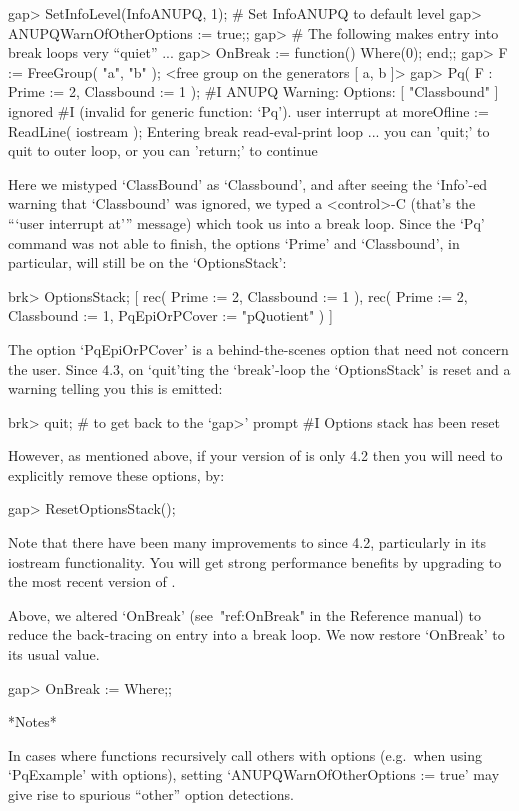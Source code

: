 \begintt
gap> SetInfoLevel(InfoANUPQ, 1);        # Set InfoANUPQ to default level
gap> ANUPQWarnOfOtherOptions := true;;
gap> # The following makes entry into break loops very ``quiet'' ...
gap> OnBreak := function() Where(0); end;;
gap> F := FreeGroup( "a", "b" );
<free group on the generators [ a, b ]>
gap> Pq( F : Prime := 2, Classbound := 1 );
#I  ANUPQ Warning: Options: [ "Classbound" ] ignored
#I  (invalid for generic function: `Pq').
user interrupt at
moreOfline := ReadLine( iostream );
Entering break read-eval-print loop ...
you can 'quit;' to quit to outer loop, or
you can 'return;' to continue
\endtt

Here we mistyped `ClassBound'  as  `Classbound',  and  after  seeing  the
`Info'-ed warning that `Classbound' was ignored, we typed  a  <control>-C
(that's the ```user interrupt at''' message) which took us into  a  break
loop. Since the `Pq' command was not able to finish, the options  `Prime'
and `Classbound', in particular, will still be on the `OptionsStack':

\begintt
brk> OptionsStack;
[ rec( Prime := 2, Classbound := 1 ), 
  rec( Prime := 2, Classbound := 1, PqEpiOrPCover := "pQuotient" ) ]
\endtt

The option `PqEpiOrPCover' is a behind-the-scenes option  that  need  not
concern the user. Since {\GAP} 4.3, on `quit'ting  the  `break'-loop  the
`OptionsStack' is reset and a warning telling you this is emitted:

\begintt
brk> quit; # to get back to the `gap>' prompt
#I  Options stack has been reset
\endtt

However, as mentioned above, if your version of {\GAP} is only  4.2  then
you will need to explicitly remove these options, by:

\begintt
gap> ResetOptionsStack();
\endtt

Note that there have been many improvements to {\GAP} since  {\GAP}  4.2,
particularly  in  its  iostream  functionality.  You  will   get   strong
performance benefits by upgrading to the most recent version of {\GAP}.

Above, we altered `OnBreak' (see~"ref:OnBreak" in the  Reference  manual)
to reduce the back-tracing on entry into a break  loop.  We  now  restore
`OnBreak' to its usual value.

\beginexample
gap> OnBreak := Where;;
\endexample

*Notes*

In cases where functions recursively call others with options  (e.g.~when
using `PqExample'  with  options),  setting  `ANUPQWarnOfOtherOptions  :=
true' may give rise to spurious ``other'' option detections.


